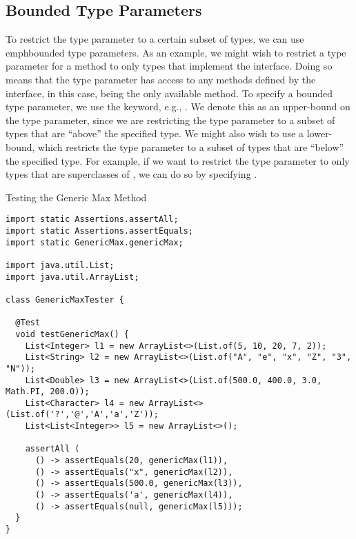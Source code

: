 \subsection{Bounded Type Parameters}
To restrict the type parameter to a certain subset of types, we can use emph{bounded type parameters}. As an example, we might wish to restrict a type parameter for a method to only types that implement the  interface. Doing so means that the type parameter has access to any methods defined by the interface, in this case,  being the only available method. To specify a bounded type parameter, we use the  keyword, e.g., . We denote this as an upper-bound on the type parameter, since we are restricting the type parameter to a subset of types that are ``above'' the specified type. We might also wish to use a lower-bound, which restricts the type parameter to a subset of types that are ``below'' the specified type. For example, if we want to restrict the type parameter to only types that are superclasses of , we can do so by specifying .


\begin{cl}[]{Testing the Generic Max Method}
\begin{lstlisting}[language=MyJava]
import static Assertions.assertAll;
import static Assertions.assertEquals;
import static GenericMax.genericMax;

import java.util.List;
import java.util.ArrayList;

class GenericMaxTester {
  
  @Test 
  void testGenericMax() {
    List<Integer> l1 = new ArrayList<>(List.of(5, 10, 20, 7, 2));
    List<String> l2 = new ArrayList<>(List.of("A", "e", "x", "Z", "3", "N"));
    List<Double> l3 = new ArrayList<>(List.of(500.0, 400.0, 3.0, Math.PI, 200.0));
    List<Character> l4 = new ArrayList<>(List.of('?','@','A','a','Z'));
    List<List<Integer>> l5 = new ArrayList<>();

    assertAll (
      () -> assertEquals(20, genericMax(l1)),
      () -> assertEquals("x", genericMax(l2)),
      () -> assertEquals(500.0, genericMax(l3)),
      () -> assertEquals('a', genericMax(l4)),
      () -> assertEquals(null, genericMax(l5)));
  }
}
\end{lstlisting}
\end{cl}


